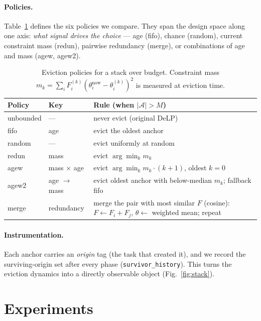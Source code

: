 \documentclass[review,12pt,number]{elsarticle}
\newcommand{\delp}{DeLP}
\begin{document}
\paragraph{Policies.}
Table~\ref{tab:policies} defines the six policies we compare. They
span the design space along one axis: \emph{what signal drives the
choice} --- age (fifo), chance (random), current constraint mass
(redun), pairwise redundancy (merge), or combinations of age and
mass (agew, agew2).

\begin{table}[t]
\centering\small
\caption{Eviction policies for a stack over budget. Constraint mass
$m_k = \sum_i F^{(k)}_i (\theta^{\text{now}}_i-\theta^{(k)}_i)^2$ is
measured at eviction time.}
\label{tab:policies}
\begin{tabular}{llp{8.2cm}}
\toprule
Policy & Key & Rule (when $|\mathcal{A}|>M$) \\
\midrule
unbounded & --- & never evict (original \delp{}) \\
fifo      & age & evict the oldest anchor \\
random    & --- & evict uniformly at random \\
redun     & mass & evict $\arg\min_k m_k$ \\
agew      & mass $\times$ age & evict $\arg\min_k m_k \cdot (k{+}1)$,
    oldest $k{=}0$ \\
agew2     & age $\to$ mass & evict oldest anchor with below-median $m_k$;
    fallback fifo \\
merge     & redundancy & merge the pair with most similar $F$
    (cosine): $F \leftarrow F_i + F_j$, $\theta \leftarrow$ weighted
    mean; repeat \\
\bottomrule
\end{tabular}
\end{table}

\begin{sloppypar}
\paragraph{Instrumentation.}
Each anchor carries an \emph{origin} tag (the task that created it),
and we record the surviving-origin set after every phase
(\texttt{survivor\_history}). This turns the eviction dynamics into a
directly observable object (Fig.~\ref{fig:stack}).
\end{sloppypar}

\section{Experiments}
\label{sec:exp}
\end{document}
